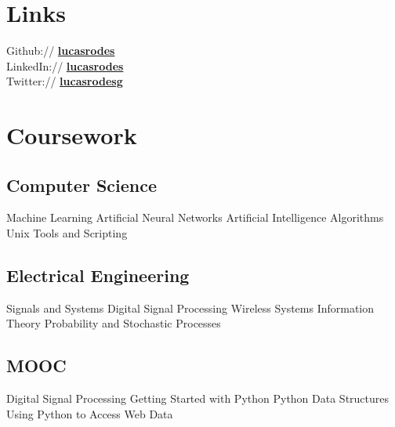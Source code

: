 \documentclass[]{deedy-resume}
\begin{document}
\begin{minipage}[t]{0.43\textwidth}


\section{Links}
Github:// \href{https://github.com/lucasrodes}{\bf lucasrodes} \\
LinkedIn://  \href{https://www.linkedin.com/in/lucasrodes}{\bf lucasrodes} \\
Twitter://  \href{https://www.twitter.com/lucasrodesg}{\bf lucasrodesg} \\
\sectionsep


\section{Coursework}

\subsection{Computer Science}
Machine Learning \textbullet{} Artificial Neural Networks \textbullet{} Artificial Intelligence \textbullet{} Algorithms \textbullet{} Unix Tools and Scripting\\
\subsection{Electrical Engineering}
Signals and Systems \textbullet{} Digital Signal Processing \textbullet{} Wireless Systems \textbullet{} Information Theory \textbullet{} Probability and Stochastic Processes\\
\subsection{MOOC}
Digital Signal Processing \textbullet{} Getting Started with Python \textbullet{} Python Data Structures \textbullet{} Using Python to Access Web Data\\



\end{minipage}
\end{document}
